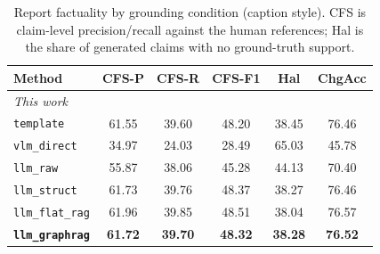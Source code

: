 \begin{table}[t]
\centering
\caption{Report factuality by grounding condition (caption style). CFS is claim-level precision/recall against the human references; Hal is the share of generated claims with no ground-truth support.}
\label{tab:factuality_caption}
\setlength{\tabcolsep}{3pt}
\scriptsize
\begin{tabular}{lccccc}
\toprule
Method & CFS-P & CFS-R & CFS-F1 & Hal & ChgAcc \\
\midrule
\multicolumn{6}{l}{\emph{This work}} \\
\texttt{template} & 61.55 & 39.60 & 48.20 & 38.45 & 76.46 \\
\texttt{vlm\_direct} & 34.97 & 24.03 & 28.49 & 65.03 & 45.78 \\
\texttt{llm\_raw} & 55.87 & 38.06 & 45.28 & 44.13 & 70.40 \\
\texttt{llm\_struct} & 61.73 & 39.76 & 48.37 & 38.27 & 76.46 \\
\texttt{llm\_flat\_rag} & 61.96 & 39.85 & 48.51 & 38.04 & 76.57 \\
\textbf{\texttt{llm\_graphrag}} & \textbf{61.72} & \textbf{39.70} & \textbf{48.32} & \textbf{38.28} & \textbf{76.52} \\
\bottomrule
\end{tabular}
\end{table}
